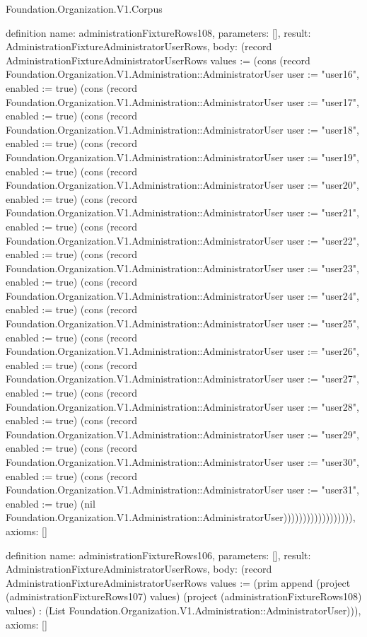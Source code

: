 \begin{lexlean}{Foundation.Organization.V1.Corpus}
\begin{semanticmodule}
definition{
  name: administrationFixtureRows108,
  parameters: [],
  result: AdministrationFixtureAdministratorUserRows,
  body: (record AdministrationFixtureAdministratorUserRows {values := (cons (record Foundation.Organization.V1.Administration::AdministratorUser {user := "user16", enabled := true}) (cons (record Foundation.Organization.V1.Administration::AdministratorUser {user := "user17", enabled := true}) (cons (record Foundation.Organization.V1.Administration::AdministratorUser {user := "user18", enabled := true}) (cons (record Foundation.Organization.V1.Administration::AdministratorUser {user := "user19", enabled := true}) (cons (record Foundation.Organization.V1.Administration::AdministratorUser {user := "user20", enabled := true}) (cons (record Foundation.Organization.V1.Administration::AdministratorUser {user := "user21", enabled := true}) (cons (record Foundation.Organization.V1.Administration::AdministratorUser {user := "user22", enabled := true}) (cons (record Foundation.Organization.V1.Administration::AdministratorUser {user := "user23", enabled := true}) (cons (record Foundation.Organization.V1.Administration::AdministratorUser {user := "user24", enabled := true}) (cons (record Foundation.Organization.V1.Administration::AdministratorUser {user := "user25", enabled := true}) (cons (record Foundation.Organization.V1.Administration::AdministratorUser {user := "user26", enabled := true}) (cons (record Foundation.Organization.V1.Administration::AdministratorUser {user := "user27", enabled := true}) (cons (record Foundation.Organization.V1.Administration::AdministratorUser {user := "user28", enabled := true}) (cons (record Foundation.Organization.V1.Administration::AdministratorUser {user := "user29", enabled := true}) (cons (record Foundation.Organization.V1.Administration::AdministratorUser {user := "user30", enabled := true}) (cons (record Foundation.Organization.V1.Administration::AdministratorUser {user := "user31", enabled := true}) (nil Foundation.Organization.V1.Administration::AdministratorUser)))))))))))))))))}),
  axioms: []
}

definition{
  name: administrationFixtureRows106,
  parameters: [],
  result: AdministrationFixtureAdministratorUserRows,
  body: (record AdministrationFixtureAdministratorUserRows {values := (prim append (project (administrationFixtureRows107) values) (project (administrationFixtureRows108) values) : (List Foundation.Organization.V1.Administration::AdministratorUser))}),
  axioms: []
}


\end{semanticmodule}
\end{lexlean}
